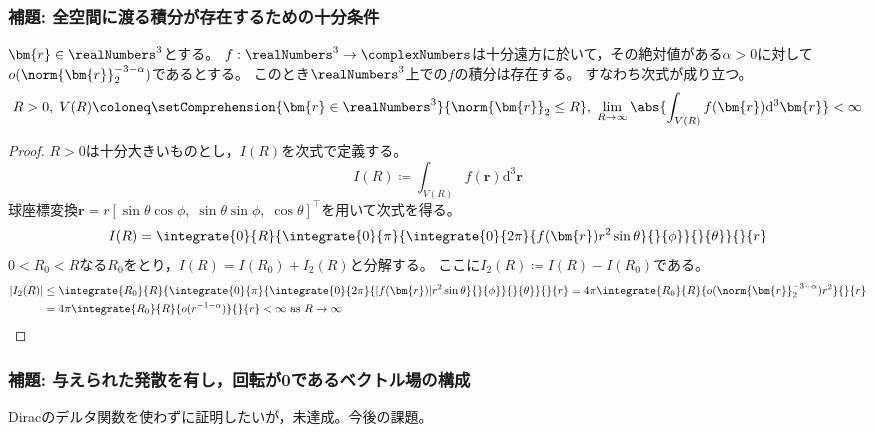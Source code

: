             \subsubsection{補題: 全空間に渡る積分が存在するための十分条件}
                \label{全空間に渡る積分が存在するための十分条件}
                \begin{shadebox}
                    $\bm{r}\in\realNumbers^3$とする。
                    $f:\realNumbers^3\to\complexNumbers$は十分遠方に於いて，その絶対値がある$\alpha>0$に対して$o(\norm{\bm{r}}_2^{-3-\alpha})$であるとする。
                    このとき$\realNumbers^3$上での$f$の積分は存在する。
                    すなわち次式が成り立つ。
                    \[ R>0,\; V(R) \coloneq \setComprehension{\bm{r}\in\realNumbers^3}{\norm{\bm{r}}_2 \leq R} ,\;\lim_{R\to\infty} \abs{\int_{V(R)} f(\bm{r}) \mathrm{d}^3\bm{r}} < \infty \]
                \end{shadebox}
                \begin{proof}
                    \quad\par
                    $R>0$は十分大きいものとし，$I(R)$を次式で定義する。
                    \[ I(R) \coloneq \int_{V(R)} f(\bm{r}) \mathrm{d}^3\bm{r} \]
                    球座標変換$\bm{r} = r[\sin\theta\cos\phi,\;\sin\theta\sin\phi,\;\cos\theta]^\top$を用いて次式を得る。
                    \[ I(R) = \integrate{0}{R}{\integrate{0}{\pi}{\integrate{0}{2\pi}{f(\bm{r})r^2\sin\theta}{}{\phi}}{}{\theta}}{}{r} \]
                    $0<R_0<R$なる$R_0$をとり，$I(R) = I(R_0) + I_2(R)$と分解する。
                    ここに$I_2(R) \coloneq I(R) - I(R_0)$である。
                    \begin{align*}
                        |I_2(R)| &\leq \integrate{R_0}{R}{\integrate{0}{\pi}{\integrate{0}{2\pi}{|f(\bm{r})|r^2\sin\theta}{}{\phi}}{}{\theta}}{}{r} = 4\pi\integrate{R_0}{R}{o(\norm{\bm{r}}_2^{-3-\alpha})r^2}{}{r} \\
                        &= 4\pi\integrate{R_0}{R}{o(r^{-1-\alpha})}{}{r} < \infty \text{ as } R\to\infty
                    \end{align*}
                \end{proof}
            \subsubsection{補題: 与えられた発散を有し，回転が\texorpdfstring{$\bm{0}$}{0}であるベクトル場の構成}
                \label{与えられた発散を有し，回転が無いベクトル場の構成}
                Diracのデルタ関数を使わずに証明したいが，未達成。今後の課題。
